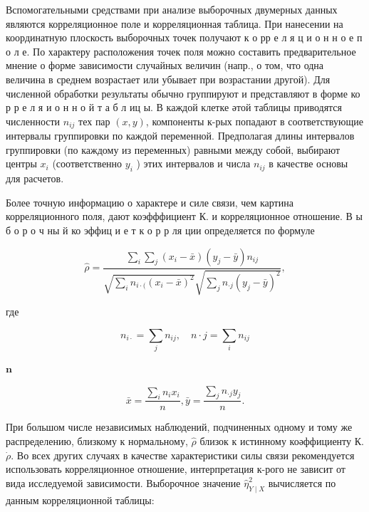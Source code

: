 \documentclass[10pt]{article}
\begin{document}
Вспомогательными средствами при анализе выборочных двумерных данных являются корреляционное поле и корреляционная таблица. При нанесении на координатную плоскость выборочных точек получают к о рр е л я ц и о н н о е п о л е. По характеру расположения точек поля можно составить предварительное мнение о форме зависимости случайных величин (напр., о том, что одна величина в среднем возрастает или убывает при возрастании другой). Для численной обработки результаты обычно группируют и представляют в форме ко р р е л я и о н н о й т а б л иц ы. В каждой клетке әтой таблицы приводятся численности $n_{i j}$ тех пар $(x, y)$, компоненты к-рых попадают в соответствующие интервалы группировки по каждой переменной. Предполагая длины интервалов группировки (по каждому из переменных) равными между собой, выбирают центры $x_{i}$ (соответственно $y_{i}$ ) этих интервалов и числа $n_{i j}$ в качестве основы для расчетов.



Более точную информацию о характере и силе связи, чем картина корреляционного поля, дают коэфффициент К. и корреляционное отношение. В ы б о р о ч ны й ко эффиц и е т к о р р ля ции определяется по формуле



\[

\hat{\rho}=\frac{\sum_{i} \sum_{j}\left(x_{i}-\bar{x}\right)\left(y_{j}-\bar{y}\right) n_{i j}}{\sqrt{\sum_{i} n_{i \cdot(}\left(x_{i}-\bar{x}\right)^{2}} \sqrt{\sum_{j} n_{\cdot j}\left(y_{j}-\bar{y}\right)^{2}}},

\]



где



\[

n_{i \cdot}=\sum_{j} n_{i j}, \quad n \cdot j=\sum_{i} n_{i j}

\]



$\mathbf{n}$



\[

\bar{x}=\frac{\sum_{i} n_{i} x_{i}}{n}, \bar{y}=\frac{\sum_{j} n_{\cdot j} y_{j}}{n} .

\]



При большом числе независимых наблюдений, подчиненных одному и тому же распределению, близкому к нормальному, $\hat{\rho}$ близок к истинному коәффициенту К. $\dot{\rho}$. Во всех других случаях в качестве характеристики силы связи рекомендуется использовать корреляционное отношение, интерпретация к-рого не зависит от вида исследуемой зависимости. Выборочное значение $\hat{\eta}_{Y \mid X}^{2}$ вычисляется по данным корреляционной таблицы:
\end{document}
